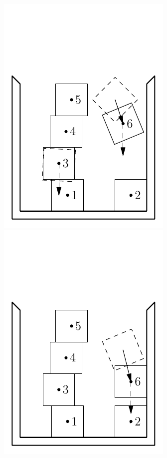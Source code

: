 \documentclass[12pt, sumlimits, intlimits]{article}
\begin{document}
\begin{figure}
\includegraphics[width=\w]{dem-7} \\
\includegraphics[width=\w]{dem-8}%

\end{figure}
\end{document}
